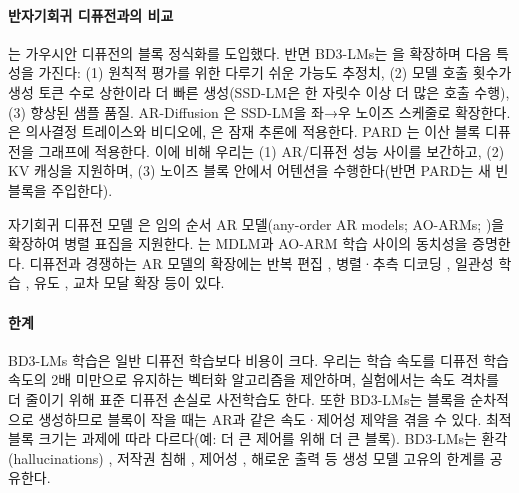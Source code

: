 \documentclass{article} %
\def\algos{BD3-LMs}
\begin{document}
\paragraph{반자기회귀 디퓨전과의 비교}
\citet{han2022ssd,han2023ssd2}는 가우시안 디퓨전의 블록 정식화를 도입했다. 반면 \algos{}는 \citet{austin2021structured}을 확장하며 다음 특성을 가진다: (1) 원칙적 평가를 위한 다루기 쉬운 가능도 추정치, (2) 모델 호출 횟수가 생성 토큰 수로 상한이라 더 빠른 생성(SSD-LM은 한 자릿수 이상 더 많은 호출 수행), (3) 향상된 샘플 품질. AR-Diffusion \citep{wu2023ardiffusion}은 SSD-LM을 좌→우 노이즈 스케줄로 확장한다. \citet{chen2025diffusion, ye2024diffusion}은 의사결정 트레이스와 비디오에, \citet{hao2024training,kong2025scalable}은 잠재 추론에 적용한다. PARD \citep{zhao2024pard}는 이산 블록 디퓨전을 그래프에 적용한다. 이에 비해 우리는 (1) AR/디퓨전 성능 사이를 보간하고, (2) KV 캐싱을 지원하며, (3) 노이즈 블록 안에서 어텐션을 수행한다(반면 PARD는 새 빈 블록을 주입한다).

자기회귀 디퓨전 모델 \citep{hoogeboom2021argmax,hoogeboom2021autoregressive}은 임의 순서 AR 모델(any-order AR models; AO-ARMs; \citet{uria2014deep})을 확장하여 병렬 표집을 지원한다. \citet{zheng2024masked}는 MDLM과 AO-ARM 학습 사이의 동치성을 증명한다.
디퓨전과 경쟁하는 AR 모델의 확장에는 반복 편집 \citep{gu2019levenshtein}, 병렬·추측 디코딩 \citep{gu2017non,santilli2023accelerating,cai2024medusa,gloeckle2024better}, 일관성 학습 \citep{kou2024cllms}, 유도 \citep{sanchez2023stay}, 교차 모달 확장 \citep{liu2023visual,tian2025visual} 등이 있다.

\paragraph{한계}

\algos{} 학습은 일반 디퓨전 학습보다 비용이 크다. 우리는 학습 속도를 디퓨전 학습 속도의 2배 미만으로 유지하는 벡터화 알고리즘을 제안하며, 실험에서는 속도 격차를 더 줄이기 위해 표준 디퓨전 손실로 사전학습도 한다. 또한 \algos{}는 블록을 순차적으로 생성하므로 블록이 작을 때는 AR과 같은 속도·제어성 제약을 겪을 수 있다. 최적 블록 크기는 과제에 따라 다르다(예: 더 큰 제어를 위해 더 큰 블록).
\algos{}는 환각(hallucinations) \citep{achiam2023gpt}, 저작권 침해 \citep{gokaslan2024commoncanvas}, 제어성 \citep{schiff2024discreteguidance,wang2023infodiff}, 해로운 출력 \citep{bai2022constitutional} 등 생성 모델 고유의 한계를 공유한다. %
\end{document}
